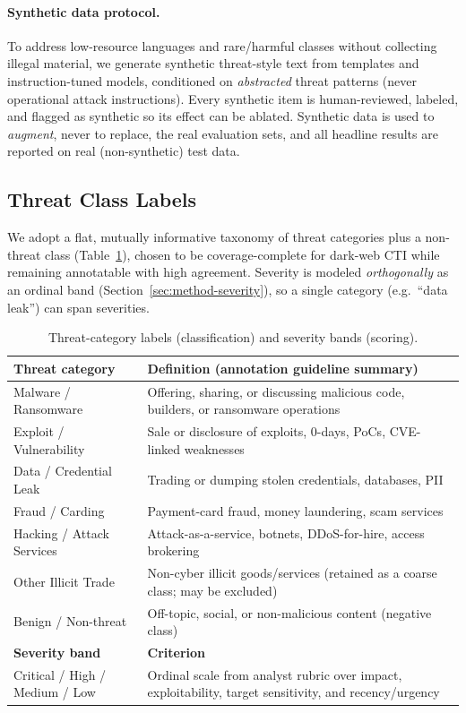 \documentclass[11pt,a4paper]{article}
\begin{document}
\paragraph{Synthetic data protocol.} To address low-resource languages and rare/harmful
classes without collecting illegal material, we generate synthetic threat-style text
from templates and instruction-tuned models, conditioned on \emph{abstracted} threat
patterns (never operational attack instructions). Every synthetic item is
human-reviewed, labeled, and flagged as synthetic so its effect can be ablated. Synthetic
data is used to \emph{augment}, never to replace, the real evaluation sets, and all
headline results are reported on real (non-synthetic) test data.

\subsection{Threat Class Labels}\label{sec:method-labels}
We adopt a flat, mutually informative taxonomy of threat categories plus a non-threat
class (Table~\ref{tab:labels}), chosen to be coverage-complete for dark-web CTI while
remaining annotatable with high agreement. Severity is modeled \emph{orthogonally} as an
ordinal band (Section~\ref{sec:method-severity}), so a single category (e.g.\ ``data
leak'') can span severities.

\begin{table}[t]
\centering
\caption{Threat-category labels (classification) and severity bands (scoring).}
\label{tab:labels}
\small
\renewcommand{\arraystretch}{1.15}
\begin{tabular}{@{}p{3.4cm}p{8.6cm}@{}}
\toprule
\textbf{Threat category} & \textbf{Definition (annotation guideline summary)} \\
\midrule
Malware / Ransomware      & Offering, sharing, or discussing malicious code, builders, or ransomware operations \\
Exploit / Vulnerability   & Sale or disclosure of exploits, 0-days, PoCs, CVE-linked weaknesses \\
Data / Credential Leak    & Trading or dumping stolen credentials, databases, PII \\
Fraud / Carding           & Payment-card fraud, money laundering, scam services \\
Hacking / Attack Services & Attack-as-a-service, botnets, DDoS-for-hire, access brokering \\
Other Illicit Trade       & Non-cyber illicit goods/services (retained as a coarse class; may be excluded) \\
Benign / Non-threat       & Off-topic, social, or non-malicious content (negative class) \\
\midrule
\textbf{Severity band} & \textbf{Criterion} \\
\midrule
Critical / High / Medium / Low & Ordinal scale from analyst rubric over impact, exploitability, target sensitivity, and recency/urgency \\
\bottomrule
\end{tabular}
\end{table}
\end{document}
